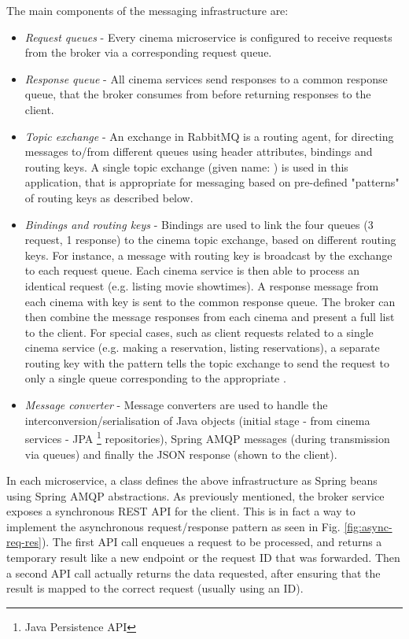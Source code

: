 The main components of the messaging infrastructure are:
\begin{itemize}
	\item \textit{Request queues} - Every cinema microservice is configured to receive requests from the broker via a corresponding request queue.
	\item \textit{Response queue} - All cinema services send responses to a common response queue, that the broker consumes from before returning responses to the client.
	\item \textit{Topic exchange} - An exchange in RabbitMQ is a routing agent, for directing messages to/from different queues using header attributes, bindings and routing keys. A single topic exchange (given name: ) is used in this application, that is appropriate for messaging based on pre-defined "patterns" of routing keys as described below.
	\item \textit{Bindings and routing keys} - Bindings are used to link the four queues (3 request, 1 response) to the cinema topic exchange, based on different routing keys. For instance, a message with routing key  is broadcast by the exchange to each request queue. Each cinema service is then able to process an identical request (e.g. listing movie showtimes). A response message from each cinema with key  is sent to the common response queue. The broker can then combine the message responses from each cinema and present a full list to the client. For special cases, such as client requests related to a single cinema service (e.g. making a reservation, listing reservations), a separate routing key with the pattern  tells the topic exchange to send the request to only a single queue corresponding to the appropriate .
	\item \textit{Message converter} - Message converters are used to handle the interconversion/serialisation of Java objects (initial stage - from cinema services - JPA \footnote{Java Persistence API} repositories), Spring AMQP messages (during transmission via queues) and finally the JSON response (shown to the client).
\end{itemize}

In each microservice, a   class defines the above infrastructure as Spring beans using Spring AMQP abstractions. As previously mentioned, the broker service exposes a synchronous REST API for the client. This is in fact a way to implement the asynchronous request/response pattern as seen in Fig. \ref{fig:async-req-res}). The first API call enqueues a request to be processed, and returns a temporary result like a new endpoint or the request ID that was forwarded. Then a second API call actually returns the data requested, after ensuring that the result is mapped to the correct request (usually using an ID).

